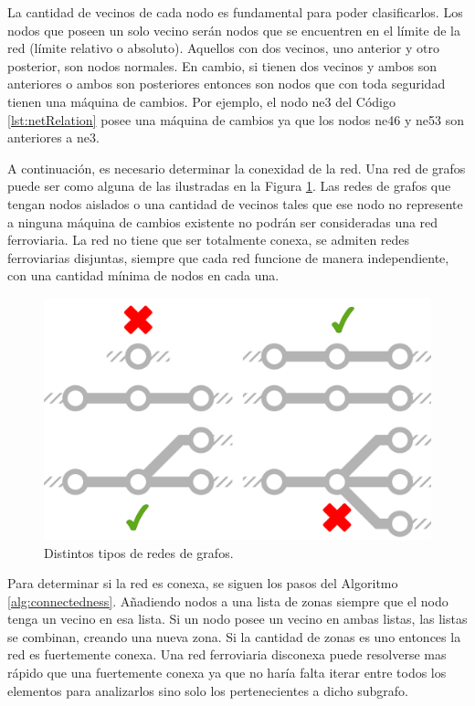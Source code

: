     La cantidad de vecinos de cada nodo es fundamental para poder clasificarlos. Los nodos que poseen un solo vecino serán nodos que se encuentren en el límite de la red (límite relativo o absoluto). Aquellos con dos vecinos, uno anterior y otro posterior, son nodos normales. En cambio, si tienen dos vecinos y ambos son anteriores o ambos son posteriores entonces son nodos que con toda seguridad tienen una máquina de cambios. Por ejemplo, el nodo ne3 del Código \ref{lst:netRelation} posee una máquina de cambios ya que los nodos ne46 y ne53 son anteriores a ne3.

    A continuación, es necesario determinar la conexidad de la red. Una red de grafos puede ser como alguna de las ilustradas en la Figura \ref{fig:conexidad}. Las redes de grafos que tengan nodos aislados o una cantidad de vecinos tales que ese nodo no represente a ninguna máquina de cambios existente no podrán ser consideradas una red ferroviaria. La red no tiene que ser totalmente conexa, se admiten redes ferroviarias disjuntas, siempre que cada red funcione de manera independiente, con una cantidad mínima de nodos en cada una.   

    \begin{figure}[H]
        \centering
        \includegraphics[width=1\textwidth]{Figuras/conexo.PNG}
        \centering\caption{Distintos tipos de redes de grafos.}
        \label{fig:conexidad}
    \end{figure}

    Para determinar si la red es conexa, se siguen los pasos del Algoritmo \ref{alg:connectedness}. Añadiendo nodos a una lista de zonas siempre que el nodo tenga un vecino en esa lista. Si un nodo posee un vecino en ambas listas, las listas se combinan, creando una nueva zona. Si la cantidad de zonas es uno entonces la red es fuertemente conexa. Una red ferroviaria disconexa puede resolverse mas rápido que una fuertemente conexa ya que no haría falta iterar entre todos los elementos para analizarlos sino solo los pertenecientes a dicho subgrafo.
        
